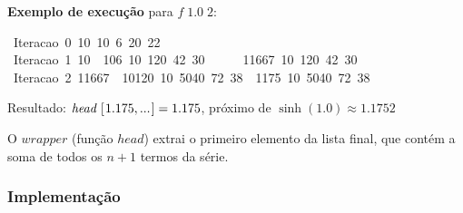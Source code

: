 \documentclass[11pt, a4paper, fleqn]{article}
\newcommand{\Varid}[1]{\mathit{#1}}
\begin{document}
\textbf{Exemplo de execução} para \ensuremath{\Varid{f}\;\mathrm{1.0}\;\mathrm{2}}:
\begin{tabbing}\ttfamily
~Iteracao~0~10~10~6~20~22\\
\ttfamily ~Iteracao~1~10~~106~10~120~42~30~~~~~~11667~10~120~42~30\\
\ttfamily ~Iteracao~2~11667~~10120~10~5040~72~38~~1175~10~5040~72~38
\end{tabbing}

Resultado: \ensuremath{\Varid{head}\;[\mskip1.5mu \mathrm{1.175},\mathbin{...}\mskip1.5mu]\mathrel{=}\mathrm{1.175}}, próximo de $\sinh(1.0) \approx 1.1752$

O \ensuremath{\Varid{wrapper}} (função \ensuremath{\Varid{head}}) extrai o primeiro elemento da lista final, que contém a soma de todos os \ensuremath{\Varid{n}\mathbin{+}\mathrm{1}} termos da série.

\subsubsection*{Implementação}
\end{document}
